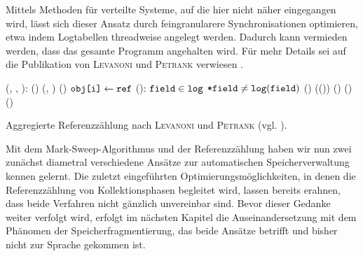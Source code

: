 Mittels Methoden für verteilte Systeme, auf die hier nicht näher eingegangen wird, lässt sich dieser Ansatz durch feingranularere Synchronisationen optimieren, etwa indem Logtabellen threadweise angelegt werden.
Dadurch kann vermieden werden, dass das gesamte Programm angehalten wird.
Für mehr Details sei auf die Publikation von \textsc{Levanoni} und \textsc{Petrank} verwiesen \cite[S. 19]{levanoni2006}.

\begin{algorithm}[h]
\begin{algorithmic}[1]
	\State \Atomic {}(, , ):
	\State \quad \IF \NOT {}()
	\State \quad \quad {}(, )	
	\State \quad \quad {}()		
	\State \quad $\texttt{obj[i]} \gets \texttt{ref}$
	\Statex
	\State \Atomic {}():
	\State \quad \FOREACH $\texttt{field} \in \texttt{log}$
	\State \quad \quad \IF $\texttt{*field} \neq \texttt{log}(\texttt{field})$	
	\State \quad \quad \quad {}()	
	\State \quad \quad \quad {}(())	
	\State \quad \quad {}()	
	\State \quad \quad {}()		
	\State \quad {}()		
\end{algorithmic}
\caption[Aggregierte Referenzzählung nach \textsc{Levanoni} und \textsc{Petrank}]{Aggregierte Referenzzählung nach \textsc{Levanoni} und \textsc{Petrank} (vgl. \cite[S. 14ff]{levanoni2006}).}
\label{algo:coalesced-rc}
\end{algorithm}

Mit dem Mark-Sweep-Algorithmus und der Referenzzählung haben wir nun zwei zunächst diametral verschiedene Ansätze zur automatischen Speicherverwaltung kennen gelernt.
Die zuletzt eingeführten Optimierungsmöglichkeiten, in denen die Referenzzählung von Kollektionsphasen begleitet wird, lassen bereits erahnen, dass beide Verfahren nicht gänzlich unvereinbar sind.
Bevor dieser Gedanke weiter verfolgt wird, erfolgt im nächsten Kapitel die Auseinandersetzung mit dem Phänomen der Speicherfragmentierung, das beide Ansätze betrifft und bisher nicht zur Sprache gekommen ist.